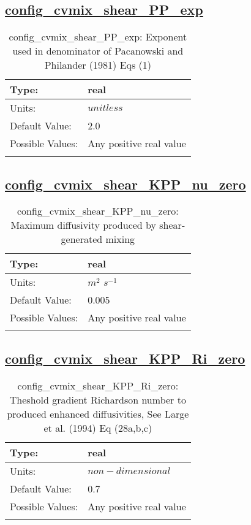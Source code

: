 \subsection[config\_cvmix\_shear\_PP\_exp]{\hyperref[sec:nm_tab_cvmix]{config\_cvmix\_shear\_PP\_exp}}
\label{subsec:nm_sec_config_cvmix_shear_PP_exp}
\begin{center}
\begin{longtable}{| p{2.0in} || p{4.0in} |}
    \hline
    Type: & real \\
    \hline
    Units: & $unitless$ \\
    \hline
    Default Value: & 2.0 \\
    \hline
    Possible Values: & Any positive real value \\
    \hline
    \caption{config\_cvmix\_shear\_PP\_exp: Exponent used in denominator of Pacanowski and Philander (1981) Eqs (1)}
\end{longtable}
\end{center}
\subsection[config\_cvmix\_shear\_KPP\_nu\_zero]{\hyperref[sec:nm_tab_cvmix]{config\_cvmix\_shear\_KPP\_nu\_zero}}
\label{subsec:nm_sec_config_cvmix_shear_KPP_nu_zero}
\begin{center}
\begin{longtable}{| p{2.0in} || p{4.0in} |}
    \hline
    Type: & real \\
    \hline
    Units: & $m^2$ $s^{-1}$ \\
    \hline
    Default Value: & 0.005 \\
    \hline
    Possible Values: & Any positive real value \\
    \hline
    \caption{config\_cvmix\_shear\_KPP\_nu\_zero: Maximum diffusivity produced by shear-generated mixing}
\end{longtable}
\end{center}
\subsection[config\_cvmix\_shear\_KPP\_Ri\_zero]{\hyperref[sec:nm_tab_cvmix]{config\_cvmix\_shear\_KPP\_Ri\_zero}}
\label{subsec:nm_sec_config_cvmix_shear_KPP_Ri_zero}
\begin{center}
\begin{longtable}{| p{2.0in} || p{4.0in} |}
    \hline
    Type: & real \\
    \hline
    Units: & $non-dimensional$ \\
    \hline
    Default Value: & 0.7 \\
    \hline
    Possible Values: & Any positive real value \\
    \hline
    \caption{config\_cvmix\_shear\_KPP\_Ri\_zero: Theshold gradient Richardson number to produced enhanced diffusivities, See Large et al. (1994) Eq (28a,b,c)}
\end{longtable}
\end{center}

